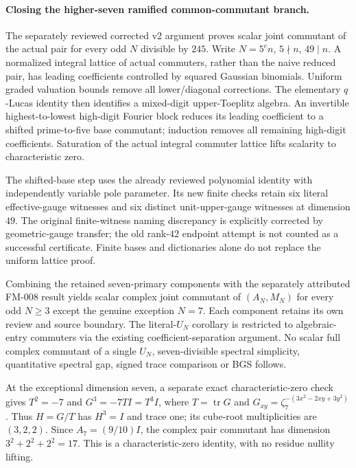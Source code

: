 \paragraph{Closing the higher-seven ramified common-commutant branch.}
The separately reviewed corrected v2 argument proves scalar joint commutant
of the actual pair for every odd $N$ divisible by $245$.
Write $N=5^e n$, $5\nmid n$, $49\mid n$. A normalized integral lattice of
actual commuters, rather than the naive reduced pair, has leading coefficients
controlled by squared Gaussian binomials. Uniform graded valuation bounds
remove all lower/diagonal corrections. The elementary $q$-Lucas identity
then identifies a mixed-digit upper-Toeplitz algebra. An invertible
highest-to-lowest high-digit Fourier block reduces its leading coefficient
to a shifted prime-to-five base commutant; induction removes all remaining
high-digit coefficients. Saturation of the actual integral commuter lattice
lifts scalarity to characteristic zero.

The shifted-base step uses the already reviewed polynomial identity with
independently variable pole parameter. Its new finite checks retain six
literal effective-gauge witnesses and six distinct unit-upper-gauge witnesses
at dimension $49$. The original finite-witness naming discrepancy is explicitly
corrected by geometric-gauge transfer; the old rank-$42$ endpoint attempt is
not counted as a successful certificate. Finite bases and dictionaries alone
do not replace the uniform lattice proof.

Combining the retained seven-primary components with the separately attributed
FM-008 result yields scalar complex joint commutant of $(A_N,M_N)$ for every
odd $N\ge3$ except the genuine exception $N=7$. Each component retains its
own review and source boundary. The literal-$U_N$ corollary is restricted to
algebraic-entry commuters via the existing coefficient-separation argument.
No scalar full complex commutant of a single $U_N$, seven-divisible spectral
simplicity, quantitative spectral gap, signed trace comparison or BGS follows.


At the exceptional dimension seven, a separate exact characteristic-zero
check gives $T^2=-7$ and $G^3=-7TI=T^3I$, where $T=\operatorname{tr}G$
and $G_{xy}=\zeta_7^{-(3x^2-2xy+3y^2)}$.
Thus $H=G/T$ has $H^3=I$ and trace one; its cube-root multiplicities are
$(3,2,2)$. Since $A_7=(9/10)I$, the complex pair commutant has dimension
$3^2+2^2+2^2=17$. This is a characteristic-zero identity, with no residue
nullity lifting.
